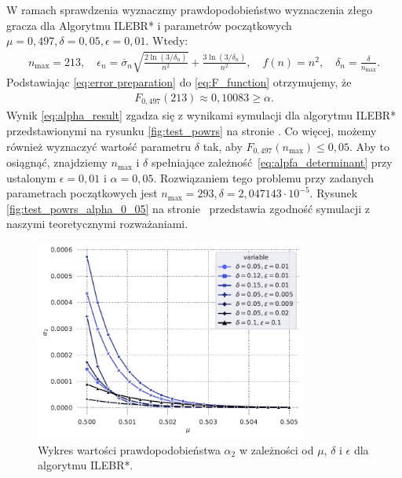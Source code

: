 \documentclass[inzynierska]{pwr_wmat_praca_dyplomowa}
\theoremstyle{plain}
\numberwithin{theorem}{chapter}
\theoremstyle{definition}
\numberwithin{theorem}{chapter}
\newcommand{\nmax}{n_{\text{max}}}
\begin{document}
	W ramach sprawdzenia wyznaczmy prawdopodobieństwo wyznaczenia złego gracza dla Algorytmu ILEBR* i parametrów początkowych $\mu = 0,497, \delta=0,05, \epsilon=0,01$.
	Wtedy:
	\begin{gather}
		\label{eq:error preparation}
		\nmax = 213,\quad
		 \epsilon_n = \overline{\sigma}_n \sqrt{\frac{2\ln(3/\delta_n)}{n^2}} + \frac{3  \ln{(3 / \delta_n)}}{n^2},\quad
		  f(n) = n^2,\quad 
		  \delta_n = \frac{\delta}{\nmax}.
	\end{gather}
	Podstawiając \eqref{eq:error preparation} do \eqref{eq:F_function} otrzymujemy, że
	\begin{gather}
		\label{eq:alpha_result}
		F_{0,497}(213)  \approx 0,10083 \ge \alpha.
	\end{gather}
	\noindent
	Wynik \eqref{eq:alpha_result} zgadza się z wynikami symulacji dla algorytmu ILEBR* przedstawionymi na rysunku \ref{fig:test_powrs} na stronie \pageref{fig:test_powrs}.
	Co więcej, możemy również wyznaczyć wartość parametru $\delta$ tak, aby $F_{0,497}(\nmax) \le 0,05$. Aby to osiągnąć, znajdziemy $\nmax$ i $\delta$ spełniające zależność~\eqref{eq:alpfa_determinant} przy ustalonym $\epsilon = 0,01$ i $\alpha=0,05$.
	Rozwiązaniem tego problemu przy zadanych parametrach początkowych jest $\nmax = 293, \delta = 2,047143\cdot10^{-5}$. Rysunek \ref{fig:test_powrs_alpha_0_05} na stronie~\pageref{fig:test_powrs_alpha_0_05} przedstawia zgodność symulacji z naszymi teoretycznymi rozważaniami.
	\begin{figure}
		\centering
		\includegraphics[width=0.8\textwidth]{imagens/alpha_2.pdf}
		\caption{Wykres wartości prawdopodobieństwa $\alpha_2$ w zależności od $\mu$, $\delta$ i $\epsilon$ dla algorytmu ILEBR*.}
		\label{fig:a2_probability}
	\end{figure}
\end{document}
